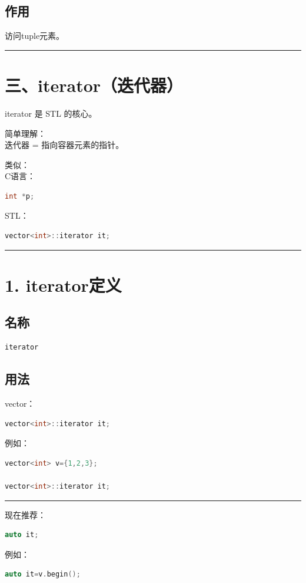 \documentclass[9pt,twocolumn]{extarticle}
\begin{document}
\subsection{作用}
访问tuple元素。

\noindent\rule{\linewidth}{0.4pt}

\section{三、iterator（迭代器）}

iterator 是 STL 的核心。

简单理解：\\
迭代器 = 指向容器元素的指针。

类似：\\
C语言：
\begin{lstlisting}[language=C++]
int *p;
\end{lstlisting}
STL：
\begin{lstlisting}[language=C++]
vector<int>::iterator it;
\end{lstlisting}

\noindent\rule{\linewidth}{0.4pt}

\section{1. iterator定义}

\subsection{名称}
\begin{lstlisting}[language=C++]
iterator
\end{lstlisting}

\subsection{用法}
vector：
\begin{lstlisting}[language=C++]
vector<int>::iterator it;
\end{lstlisting}
例如：
\begin{lstlisting}[language=C++]
vector<int> v={1,2,3};

vector<int>::iterator it;
\end{lstlisting}

\noindent\rule{\linewidth}{0.4pt}

现在推荐：
\begin{lstlisting}[language=C++]
auto it;
\end{lstlisting}
例如：
\begin{lstlisting}[language=C++]
auto it=v.begin();
\end{lstlisting}
\end{document}
